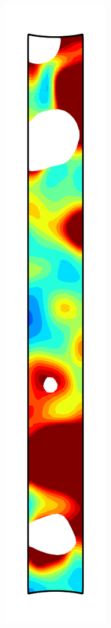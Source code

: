\begin{figure}[!htb]
\begin{subfigure}{0.08\textwidth}
  \end{subfigure}
  \begin{subfigure}{0.08\textwidth}
    \centering
    \includegraphics[width=\textwidth]{Chapter5/figures/spallation/ep_8}

\end{subfigure}
\end{figure}

